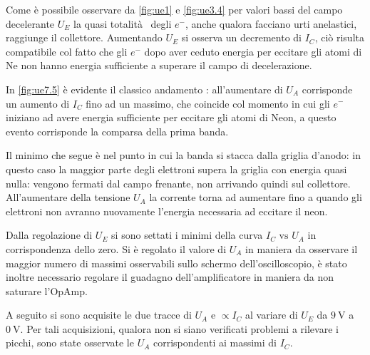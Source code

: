 	Come è possibile osservare da \figurename{ \ref{fig:ue1}} e \figurename{ \ref{fig:ue3.4}}
	per valori bassi del campo decelerante $U_E$ la quasi totalità  degli $e^{-}$, anche qualora facciano
	urti anelastici, raggiunge il collettore.
	Aumentando $U_E$ si osserva un decremento
	di $I_C$, ciò risulta compatibile col fatto che gli $e^{-}$
	dopo aver ceduto energia per eccitare gli atomi di Ne
	non hanno energia sufficiente a superare il campo di decelerazione.


In \figurename{ \ref{fig:ue7.5}} è evidente il classico andamento  : all'aumentare di $U_A$ corrisponde un aumento di $I_C$ fino ad un massimo, che coincide col momento in cui gli $e^-$ iniziano ad avere energia sufficiente per eccitare gli atomi di Neon, a questo evento corrisponde la comparsa della prima banda.

	Il minimo che segue è nel punto in cui la banda si stacca dalla griglia d'anodo: in questo caso la maggior parte degli elettroni supera la griglia con energia quasi nulla: vengono fermati dal campo frenante, non arrivando quindi sul collettore.
	All'aumentare della tensione $U_A$ la corrente torna ad aumentare fino a quando gli elettroni non avranno nuovamente l'energia necessaria ad eccitare il neon.

	Dalla regolazione di $U_E$ si sono settati i minimi della curva
	$I_C \text{ vs } U_A$ in corrispondenza dello zero.
	Si è regolato il valore di $U_A$ in maniera da osservare il maggior
	numero di massimi osservabili sullo schermo dell'oscilloscopio,
	è stato inoltre necessario regolare il guadagno dell'amplificatore
	in maniera da non saturare l'OpAmp.

	A seguito si sono acquisite le due tracce di $U_A$ e $\propto I_C$ al variare di
	$U_E$ da $\SI{9}{\volt}$ a $\SI{0}{\volt}$. Per  tali acquisizioni, qualora non si siano
	verificati problemi a rilevare i picchi, sono state
	osservate le $U_A$ corrispondenti ai massimi di $I_C$.


